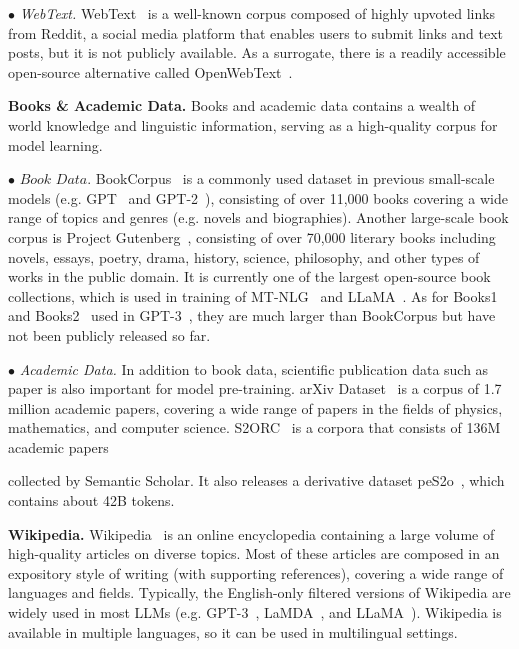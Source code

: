 $\bullet$ \textit{WebText.} {WebText~\cite{radford-blog-2019-language} is a well-known corpus composed of highly upvoted links from Reddit, a social media platform that enables users to submit links and text posts, but it is not publicly available. As a surrogate, there is a readily accessible open-source alternative called OpenWebText~\cite{Gokaslan2019OpenWeb}.}

\textbf{Books \& Academic Data.} Books and academic data contains a wealth of world knowledge and linguistic information, serving as a high-quality corpus for model learning. 

$\bullet \textit{ Book Data.}$ BookCorpus~\cite{Zhu-ICCV-2015-Aligning} is a commonly used dataset in previous small-scale models (e.g. GPT~\cite{radford-openai-2018-improving} and GPT-2~\cite{radford-blog-2019-language}), consisting of over 11,000 books covering a wide range of topics and genres (e.g. novels and biographies). Another large-scale book corpus is Project Gutenberg~\cite{Gutenberg}, consisting of over 70,000 literary books including novels, essays, poetry, drama, history, science, philosophy, and other types of works in the public domain. It is currently one of the largest open-source book collections, which is used in training of MT-NLG~\cite{Smith-CoRR-2022-Using} and LLaMA~\cite{Touvron-arxiv-2023-LLaMA}. As for Books1~\cite{Brown-NeurIPS-2020-Language} and Books2~\cite{Brown-NeurIPS-2020-Language} used in GPT-3~\cite{Brown-NeurIPS-2020-Language}, they are much larger than BookCorpus but have not been publicly released so far. 

$\bullet$ \textit{ Academic Data. } In addition to book data, scientific publication data such as paper is also important for model pre-training.  arXiv Dataset~\cite{clement-arxiv-2019-ontheuse} is a corpus of 1.7 million academic papers, covering a wide range of papers in the fields of physics, mathematics, and computer science. S2ORC~\cite{lo-2020-ACL-s2orc} is a corpora that consists of 136M academic papers {collected by Semantic Scholar. It also releases a derivative dataset peS2o~\cite{peS2o}, which contains about 42B tokens. 

}

\textbf{Wikipedia.} 
Wikipedia~\cite{Wikipedia} is an online encyclopedia containing a large volume of high-quality articles on diverse topics. {Most of these articles are composed in an expository style of writing (with supporting references), covering a wide range of languages and fields. } Typically, the English-only filtered versions of Wikipedia are widely used in most LLMs (e.g. GPT-3~\cite{Brown-NeurIPS-2020-Language}, LaMDA~\cite{Thoppilan-CoRR-2022-LaMDA}, and LLaMA~\cite{Touvron-arxiv-2023-LLaMA}). Wikipedia is available in multiple languages,  so it can be used in multilingual settings.

